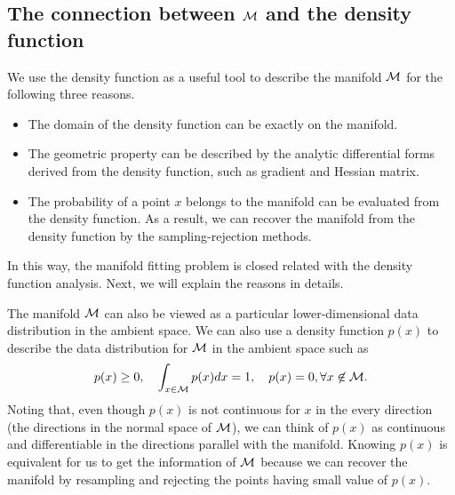 \documentclass[aos,preprint]{imsart}
\theoremstyle{remark}
\begin{document}
\subsection{The connection between $\cal M$ and the density function}
We use the density function as a useful tool to describe the manifold $\cal M$ for the following three reasons.
\begin{itemize}
\item The domain of the density function can be exactly on the manifold. 
\item The geometric property can be described by the analytic differential forms derived from the density function, such as gradient and Hessian matrix.
\item The probability of a point $x$ belongs to the manifold can be evaluated from the density function. As a result, we can recover the manifold from the density function by the sampling-rejection methods.
\end{itemize}
In this way, the manifold fitting problem is closed related with the density function analysis. Next, we will explain the reasons in details.

The manifold $\cal M$ can also be viewed as a particular lower-dimensional data distribution in the ambient space. We can also use a density function $p(x)$ to describe the data distribution for $\cal M$ in the ambient space such as
\[
p(x)\geq 0,\quad  \int_{x\in \cal M} p(x)dx=1, \quad p(x) = 0, \forall x\not \in \cal M.
\] Noting that, even though $p(x)$ is not continuous for $x$ in the every direction (the directions in the normal space of $\cal M$), we can think of $p(x)$ as continuous and differentiable in the directions parallel with the manifold. Knowing $p(x)$ is equivalent for us to get the information of $\cal M$ because we can recover the manifold by resampling and rejecting the points having small value of $p(x)$.
\end{document}
